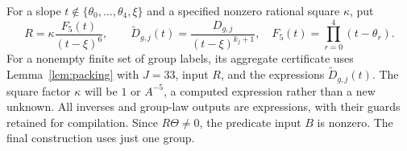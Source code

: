 \documentclass[11pt,reqno]{amsart}
\theoremstyle{definition}
\numberwithin{equation}{section}
\begin{document}
For a slope $t\notin\{\theta_0,\ldots,\theta_4,\xi\}$ and a specified nonzero rational square $\kappa$, put
\begin{equation}\label{eq:scaleddata}
 R=\kappa\frac{F_5(t)}{(t-\xi)^6},\qquad
 \widetilde D_{g,j}(t)=\frac{D_{g,j}}{(t-\xi)^{k_j+1}},
 \quad F_5(t)=\prod_{r=0}^4(t-\theta_r).
\end{equation}
For a nonempty finite set of group labels, its aggregate certificate uses Lemma~\ref{lem:packing} with $J=33$, input $R$, and the expressions $\widetilde D_{g,j}(t)$. The square factor $\kappa$ will be $1$ or $A^{-5}$, a computed expression rather than a new unknown. All inverses and group-law outputs are expressions, with their guards retained for compilation. Since $R\Theta\ne0$, the predicate input $B$ is nonzero. The final construction uses just one group.
\end{document}
